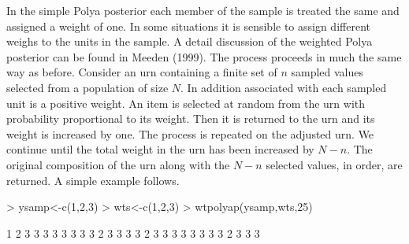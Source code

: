 \documentclass{article}
\begin{document}
In the simple 
Polya posterior each member of the sample is treated the same and 
assigned a weight of one. In some situations it is sensible to assign 
different weighs to the units in the sample. A detail discussion of 
the weighted Polya posterior can be found in Meeden (1999). \nocite{mee99} 
The process proceeds 
in much the same way as before. Consider an urn containing
  a finite set of $n$ sampled values 
selected from a population of size $N$.
  In addition associated with each sampled unit is a positive weight.
  An item is selected at random from the urn with probability
  proportional to its weight. Then it is returned to the urn and its
  weight is increased by one. The process is repeated on the
  adjusted urn. We continue until the total weight in the urn has
  been increased by $N-n$.
  The original composition of the urn along with the $N-n$ selected
  values, in order, are returned. A simple example follows.

\begin{Schunk}
\begin{Sinput}
> ysamp<-c(1,2,3)
> wts<-c(1,2,3)
> wtpolyap(ysamp,wts,25)
\end{Sinput}
\begin{Soutput}
 [1] 1 2 3 3 3 3 3 3 3 3 2 3 3 3 3 2 3 3 3 3 3 3 3 3 2 3 3 3
\end{Soutput}
\end{Schunk}



\end{document}
